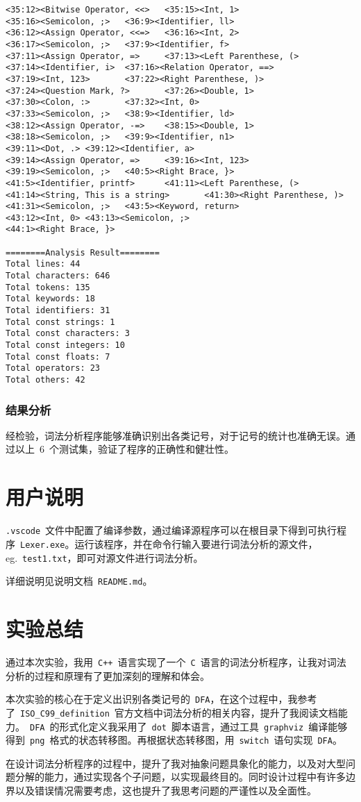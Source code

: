 \documentclass[lang=cn,11pt,a4paper]{paper}
\begin{document}
\begin{lstlisting}
<35:12><Bitwise Operator, <<>   <35:15><Int, 1>
<35:16><Semicolon, ;>   <36:9><Identifier, ll>
<36:12><Assign Operator, <<=>   <36:16><Int, 2>
<36:17><Semicolon, ;>   <37:9><Identifier, f>
<37:11><Assign Operator, =>     <37:13><Left Parenthese, (>
<37:14><Identifier, i>  <37:16><Relation Operator, ==>
<37:19><Int, 123>       <37:22><Right Parenthese, )>
<37:24><Question Mark, ?>       <37:26><Double, 1>
<37:30><Colon, :>       <37:32><Int, 0>
<37:33><Semicolon, ;>   <38:9><Identifier, ld>
<38:12><Assign Operator, -=>    <38:15><Double, 1>
<38:18><Semicolon, ;>   <39:9><Identifier, n1>
<39:11><Dot, .> <39:12><Identifier, a>
<39:14><Assign Operator, =>     <39:16><Int, 123>
<39:19><Semicolon, ;>   <40:5><Right Brace, }>
<41:5><Identifier, printf>      <41:11><Left Parenthese, (>
<41:14><String, This is a string>       <41:30><Right Parenthese, )>
<41:31><Semicolon, ;>   <43:5><Keyword, return>
<43:12><Int, 0> <43:13><Semicolon, ;>
<44:1><Right Brace, }>

========Analysis Result========
Total lines: 44
Total characters: 646
Total tokens: 135
Total keywords: 18
Total identifiers: 31
Total const strings: 1
Total const characters: 3
Total const integers: 10
Total const floats: 7
Total operators: 23
Total others: 42
\end{lstlisting}

\subsubsection{结果分析}

经检验，词法分析程序能够准确识别出各类记号，对于记号的统计也准确无误。通过以上\ 6\ 个测试集，验证了程序的正确性和健壮性。

\section{用户说明}

\lstinline{.vscode}\ 文件中配置了编译参数，通过编译源程序可以在根目录下得到可执行程序\ \lstinline{Lexer.exe}。运行该程序，并在命令行输入要进行词法分析的源文件，eg.\ \lstinline{test1.txt}，即可对源文件进行词法分析。

详细说明见说明文档\ \lstinline{README.md}。

\section{实验总结}

通过本次实验，我用\ \lstinline{C++}\ 语言实现了一个\ \lstinline{C}\ 语言的词法分析程序，让我对词法分析的过程和原理有了更加深刻的理解和体会。

本次实验的核心在于定义出识别各类记号的\ \lstinline{DFA}，在这个过程中，我参考了\ \lstinline{ISO_C99_definition}\ 官方文档中词法分析的相关内容，提升了我阅读文档能力。\ \lstinline{DFA}\ 的形式化定义我采用了\ \lstinline{dot}\ 脚本语言，通过工具\ \lstinline{graphviz}\ 编译能够得到\ \lstinline{png}\ 格式的状态转移图。再根据状态转移图，用\ \lstinline{switch}\ 语句实现\ \lstinline{DFA}。

在设计词法分析程序的过程中，提升了我对抽象问题具象化的能力，以及对大型问题分解的能力，通过实现各个子问题，以实现最终目的。同时设计过程中有许多边界以及错误情况需要考虑，这也提升了我思考问题的严谨性以及全面性。
\end{document}
